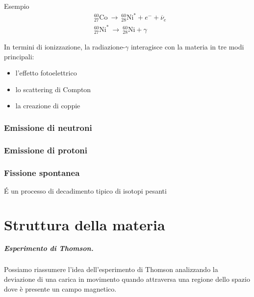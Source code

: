 \noindent
Esempio
\begin{equation}
\begin{aligned}
    & {}^{60}_{27} \text{Co}   \ \rightarrow \ {}^{60}_{28} \text{Ni}^* + e^- + \overline{\nu}_e \\
    & {}^{60}_{27} \text{Ni}^* \ \rightarrow \ {}^{60}_{28} \text{Ni} + \gamma
\end{aligned}
\end{equation}

\noindent
In termini di ionizzazione, la radiazione-$\gamma$ interagisce con la materia in tre modi principali:
\begin{itemize}
    \item l'effetto fotoelettrico
    \item lo scattering di Compton
    \item la creazione di coppie
\end{itemize}

\subsection{Emissione di neutroni}
\subsection{Emissione di protoni}
\subsection{Fissione spontanea}
\'E un processo di decadimento tipico di isotopi pesanti

\chapter{Struttura della materia}

\paragraph{Esperimento di Thomson.} Possiamo riassumere l'idea dell'esperimento di Thomson analizzando la deviazione di una carica in movimento quando attraversa una regione dello spazio dove è presente un campo magnetico.

